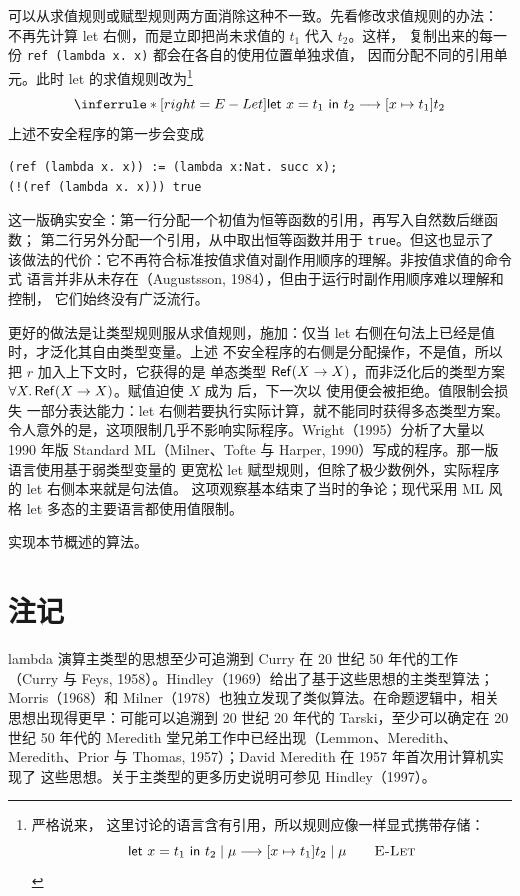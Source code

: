可以从求值规则或赋型规则两方面消除这种不一致。先看修改求值规则的办法：
不再先计算 let 右侧，而是立即把尚未求值的 \(t_1\) 代入 \(t_2\)。这样，
复制出来的每一份 \texttt{ref (lambda x. x)} 都会在各自的使用位置单独求值，
因而分配不同的引用单元。此时 let 的求值规则改为\footnote{严格说来，
这里讨论的语言含有引用，所以规则应像一样显式携带存储：
\[
\mathsf{let}\ x=t_1\ \mathsf{in}\ t_2\mid\mu
\longrightarrow[x\mapsto t_1]t_2\mid\mu
\qquad\textsc{E-Let}
\]
}
\[
\inferrule*[right=E-Let]{ }
 {\taplterm{let}\ x=t_1\ \taplterm{in}\ t_2
  \longrightarrow [x\mapsto t_1]t_2}
\]
上述不安全程序的第一步会变成
\begin{lstlisting}
(ref (lambda x. x)) := (lambda x:Nat. succ x);
(!(ref (lambda x. x))) true
\end{lstlisting}
这一版确实安全：第一行分配一个初值为恒等函数的引用，再写入自然数后继函数；
第二行另外分配一个引用，从中取出恒等函数并用于 \texttt{true}。但这也显示了
该做法的代价：它不再符合标准按值求值对副作用顺序的理解。非按值求值的命令式
语言并非从未存在（Augustsson, 1984），但由于运行时副作用顺序难以理解和控制，
它们始终没有广泛流行。

更好的做法是让类型规则服从求值规则，施加：仅当 let 右侧在句法上已经是值时，才泛化其自由类型变量。上述
不安全程序的右侧是分配操作，不是值，所以把 \(r\) 加入上下文时，它获得的是
单态类型 \(\mathsf{Ref}(X\to X)\)，而非泛化后的类型方案
\(\forall X.\,\mathsf{Ref}(X\to X)\)。赋值迫使 \(X\) 成为
 后，下一次以  使用便会被拒绝。值限制会损失
一部分表达能力：let 右侧若要执行实际计算，就不能同时获得多态类型方案。
令人意外的是，这项限制几乎不影响实际程序。Wright（1995）分析了大量以 1990 年版
Standard ML（Milner、Tofte 与 Harper, 1990）写成的程序。那一版语言使用基于弱类型变量的
更宽松 let 赋型规则，但除了极少数例外，实际程序的 let 右侧本来就是句法值。
这项观察基本结束了当时的争论；现代采用 ML 风格 let 多态的主要语言都使用值限制。

\begin{exercise}[\(\star\star\), \(\nrightarrow\)]
\label{ex:22.7.1}
实现本节概述的算法。
\end{exercise}

\section{注记}
\label{sec:22.8}

lambda 演算主类型的思想至少可追溯到 Curry 在 20 世纪 50 年代的工作
（Curry 与 Feys, 1958）。Hindley（1969）给出了基于这些思想的主类型算法；
Morris（1968）和 Milner（1978）也独立发现了类似算法。在命题逻辑中，相关
思想出现得更早：可能可以追溯到 20 世纪 20 年代的 Tarski，至少可以确定在
20 世纪 50 年代的 Meredith 堂兄弟工作中已经出现（Lemmon、Meredith、
Meredith、Prior 与 Thomas, 1957）；David Meredith 在 1957 年首次用计算机实现了
这些思想。关于主类型的更多历史说明可参见 Hindley（1997）。

